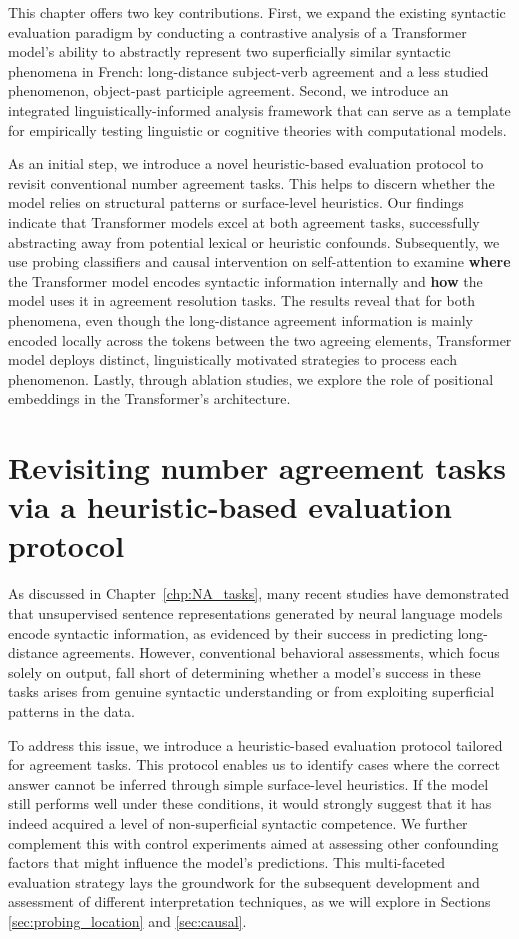 This chapter offers two key contributions.
First, we expand the existing syntactic evaluation paradigm by conducting a contrastive analysis of a Transformer model's ability to abstractly represent two superficially similar syntactic phenomena in French: long-distance subject-verb agreement and a less studied phenomenon, object-past participle agreement. 
Second, we introduce an integrated linguistically-informed analysis framework that can serve as a template for empirically testing linguistic or cognitive theories with computational models. 

As an initial step, we introduce a novel heuristic-based evaluation protocol to revisit conventional number agreement tasks. This helps to discern whether the model relies on structural patterns or surface-level heuristics. Our findings indicate that Transformer models excel at both agreement tasks, successfully abstracting away from potential lexical or heuristic confounds. Subsequently, we use probing classifiers and causal intervention on self-attention to examine
\textbf{where} the Transformer model encodes syntactic information internally and \textbf{how} the model uses it in agreement resolution tasks. The results reveal that for both phenomena, even though the long-distance
agreement information is mainly encoded locally across the tokens
between the two agreeing elements, Transformer model deploys distinct, linguistically motivated strategies to process each phenomenon. Lastly, through ablation studies, we explore the role of positional embeddings in the Transformer's architecture. 


\section{Revisiting number agreement tasks via a heuristic-based evaluation protocol} \label{sec:heuristics}

As discussed in Chapter~\ref{chp:NA_tasks}, many recent studies have demonstrated that unsupervised sentence representations generated by neural language models encode syntactic information, as evidenced by their success in predicting long-distance agreements. However, conventional behavioral assessments, which focus solely on output, fall short of determining whether a model's success in these tasks arises from genuine syntactic understanding or from exploiting superficial patterns in the data.

To address this issue, we introduce a heuristic-based evaluation protocol tailored for agreement tasks.  This protocol enables us to identify cases where the correct answer cannot be inferred through simple surface-level heuristics. If the model still performs well under these conditions, it would strongly suggest that it has indeed acquired a level of non-superficial syntactic competence.
We further complement this with control experiments aimed at assessing other confounding factors that might influence the model's predictions. This multi-faceted evaluation strategy lays the groundwork for the subsequent development and assessment of different interpretation techniques, as we will explore in Sections \ref{sec:probing_location} and \ref{sec:causal}.

